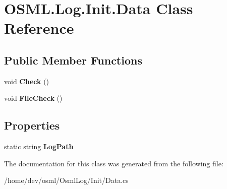 \hypertarget{classOSML_1_1Log_1_1Init_1_1Data}{}\section{O\+S\+M\+L.\+Log.\+Init.\+Data Class Reference}
\label{classOSML_1_1Log_1_1Init_1_1Data}
\subsection*{Public Member Functions}
\begin{DoxyCompactItemize}
\item 
\mbox{\label{classOSML_1_1Log_1_1Init_1_1Data_a9a2073dc3bfb638ef50856fa7f275cc8}} 
void {\bfseries Check} ()
\item 
\mbox{\label{classOSML_1_1Log_1_1Init_1_1Data_ad1aef091924fb24fcc19efe3340b64f8}} 
void {\bfseries File\+Check} ()
\end{DoxyCompactItemize}
\subsection*{Properties}
\begin{DoxyCompactItemize}
\item 
\mbox{\label{classOSML_1_1Log_1_1Init_1_1Data_a3016c23a417c40b4f54f1659b0d130e3}} 
static string {\bfseries Log\+Path}
\end{DoxyCompactItemize}


The documentation for this class was generated from the following file\+:\begin{DoxyCompactItemize}
\item 
/home/dev/osml/\+Osml\+Log/\+Init/Data.\+cs\end{DoxyCompactItemize}

